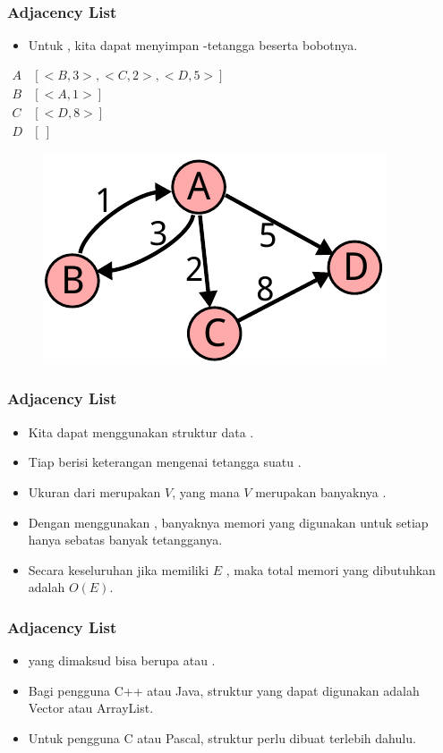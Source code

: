 \begin{frame}
\frametitle{Adjacency List}
\begin{itemize}
  \item Untuk  \fgraph, kita dapat menyimpan \fnode-\fnode tetangga beserta bobotnya.
\end{itemize}
\begin{center}
\begin{multicols}{2}
  $\begin{array}{r|l}
    A & [<B,3> , <C,2>, <D,5>] \\
    B & [<A,1>] \\
    C & [<D,8>] \\
    D & [\ ]
  \end{array}$
  \break
  \begin{figure}
    \includegraphics[width=4 cm]{asset/weighted-directed.pdf}
  \end{figure}
\end{multicols} 
\end{center}
\end{frame}

\begin{frame}
\frametitle{Adjacency List}
\begin{itemize}
  \item Kita dapat menggunakan struktur data .
  \item Tiap \flist berisi keterangan mengenai tetangga suatu \fnode.
  \item Ukuran dari \farray merupakan $V$, yang mana $V$ merupakan banyaknya \fnode.
  \item Dengan menggunakan \flist, banyaknya memori yang digunakan untuk setiap \fnode hanya sebatas banyak tetangganya.
  \item Secara keseluruhan jika \fgraph memiliki $E$ \fedge, maka total memori yang dibutuhkan adalah $O(E)$.
\end{itemize}
\end{frame}

\begin{frame}
\frametitle{Adjacency List}
\begin{itemize}
  \item \fList yang dimaksud bisa berupa  atau .
  \item Bagi pengguna C++ atau Java, struktur \flist yang dapat digunakan adalah Vector atau ArrayList.
  \item Untuk pengguna C atau Pascal, struktur  perlu dibuat terlebih dahulu.
\end{itemize}
\end{frame}

